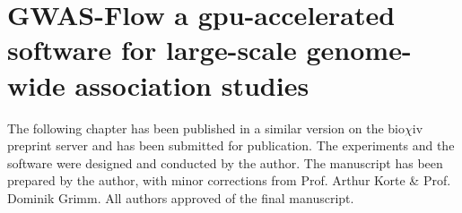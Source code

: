 
\chapter{GWAS-Flow a gpu-accelerated software for large-scale genome-wide association studies}

\label{Chapter3} %


The following chapter has been published in a similar version on the bio$\chi$iv preprint
server \cite{Freudenthal_2019} and has been submitted for publication. The experiments and
the software were designed and conducted by the author. The manuscript has been prepared
by the author, with minor corrections from Prof. Arthur Korte \& Prof. Dominik Grimm. All
authors approved of the final manuscript.


